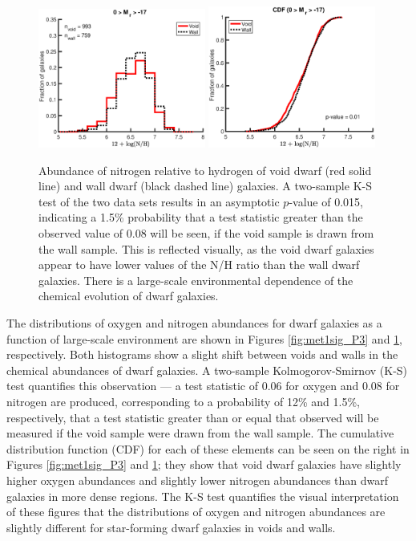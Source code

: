 \begin{figure}
    \centering
    \includegraphics[width=0.49\textwidth]{Images/Paper3/1sig_dwarf_SF_t3_12logNHrelations_dust_hist}
    \includegraphics[width=0.49\textwidth]{Images/Paper3/1sig_dwarf_SF_t3_12logNHrelations_dust_CDF}
    \caption[N/H distribution for dwarf galaxy sample]{Abundance of nitrogen 
    relative to hydrogen of void dwarf (red solid line) and wall dwarf (black 
    dashed line) galaxies.  A two-sample K-S test of the two data sets results 
    in an asymptotic $p$-value of 0.015, indicating a 1.5\% probability that a 
    test statistic greater than the observed value of 0.08 will be seen, if the 
    void sample is drawn from the wall sample.  This is reflected visually, as 
    the void dwarf galaxies appear to have lower values of the N/H ratio than 
    the wall dwarf galaxies.  There is a large-scale environmental dependence of 
    the chemical evolution of dwarf galaxies.}
    \label{fig:N_1sig_P3}
\end{figure}

The distributions of oxygen and nitrogen abundances for dwarf galaxies as a 
function of large-scale environment are shown in Figures \ref{fig:met1sig_P3} 
and \ref{fig:N_1sig_P3}, respectively.  Both histograms show a slight shift 
between voids and walls in the chemical abundances of dwarf galaxies.  A 
two-sample Kolmogorov-Smirnov (K-S) test quantifies this observation --- a test 
statistic of 0.06 for oxygen and 0.08 for nitrogen are produced, corresponding 
to a probability of 12\% and 1.5\%, respectively, that a test statistic greater 
than or equal that observed will be measured if the void sample were drawn from 
the wall sample.  The cumulative distribution function (CDF) for each of these 
elements can be seen on the right in Figures \ref{fig:met1sig_P3} and 
\ref{fig:N_1sig_P3}; they show that void dwarf galaxies have slightly higher 
oxygen abundances and slightly lower nitrogen abundances than dwarf galaxies in 
more dense regions.  The K-S test quantifies the visual interpretation of these 
figures that the distributions of oxygen and nitrogen abundances are slightly 
different for star-forming dwarf galaxies in voids and walls.

